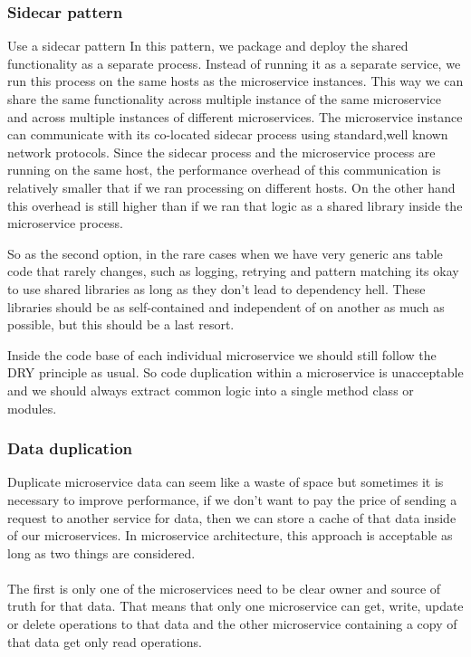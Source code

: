 \subsubsection{Sidecar pattern}
Use a sidecar pattern
In this pattern, we package and deploy the shared functionality as a separate process.
Instead of running it as a separate service, we run this process on the same hosts as the microservice instances.
This way we can share the same functionality across multiple instance of the same microservice and across multiple instances of different microservices.
The microservice instance can communicate with its co-located sidecar process using standard,well known network protocols.
Since the sidecar process and the microservice process are running on the same host, the performance overhead of this communication is relatively smaller that if we ran processing on different hosts.
On the other hand this overhead is still higher than if we ran that logic as a shared library inside the microservice process.

So as the second option, in the rare cases when we have very generic ans table code that rarely changes, such as logging, retrying and pattern matching its okay to use shared libraries as long as they don't lead to dependency hell.
These libraries should be as self-contained and independent of on another as much as possible, but this should be a last resort.

\begin{note}
    Inside the code base of each individual microservice we should still follow the DRY principle as usual.
    So code duplication within a microservice is unacceptable and we should always extract common logic into a single method class or modules.
\end{note}

\subsubsection{Data duplication}
Duplicate microservice data can seem like a waste of space but sometimes it is necessary to improve performance, if we don't want to pay the price of sending a request to another service for data, then we can store a cache of that data inside of our microservices.
In microservice architecture, this approach is acceptable as long as two things are considered.

\paragraph{}
The first is only one of the microservices need to be clear owner and source of truth for that data.
That means that only one microservice can get, write, update or delete operations to that data and the other microservice containing a copy of that data get only read operations.

